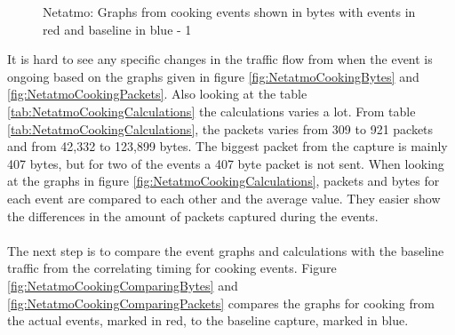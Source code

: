 \begin{figure}[H]
\begin{subfigure}[b]{0.47\textwidth}
        \centering
    \end{subfigure}
        \begin{subfigure}[b]{0.47\textwidth}
        \centering
    \end{subfigure}
    \begin{subfigure}[b]{0.47\textwidth}
        \centering
    \end{subfigure}
    \begin{subfigure}[b]{0.47\textwidth}
        \centering
    \end{subfigure}
    \hspace{0.6cm}
    \begin{subfigure}[b]{0.47\textwidth}
    \centering
        \end{subfigure}
    \caption{Netatmo: Graphs from cooking events shown in bytes with events in red and baseline in blue - 1}
    \label{fig:NetatmoCookingBytes1}
\end{figure}



It is hard to see any specific changes in the traffic flow from when the event is ongoing based on the graphs given in figure \ref{fig:NetatmoCookingBytes} and \ref{fig:NetatmoCookingPackets}. Also looking at the table \ref{tab:NetatmoCookingCalculations} the calculations varies a lot. From table \ref{tab:NetatmoCookingCalculations}, the packets varies from 309 to 921 packets and from 42,332 to 123,899 bytes. The biggest packet from the capture is mainly 407 bytes, but for two of the events a 407 byte packet is not sent. When looking at the graphs in figure \ref{fig:NetatmoCookingCalculations}, packets and bytes for each event are compared to each other and the average value. They easier show the differences in the amount of packets captured during the events. 
\\\\
The next step is to compare the event graphs and calculations with the baseline traffic from the correlating timing for cooking events. Figure \ref{fig:NetatmoCookingComparingBytes} and \ref{fig:NetatmoCookingComparingPackets} compares the graphs for cooking from the actual events, marked in red, to the baseline capture, marked in blue. 



